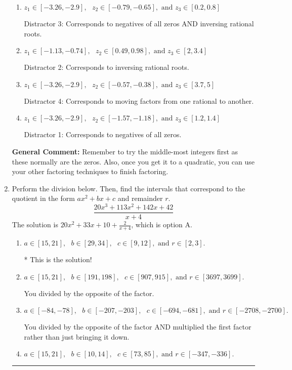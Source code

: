 \documentclass{extbook}[14pt]
\newcommand{\litem}[1]{\item #1

\rule{\textwidth}{0.4pt}}
\begin{document}
\begin{enumerate}
{\begin{enumerate}[label=\Alph*.]
* This is the solution!
\item \( z_1 \in [-3.26, -2.9], \text{   }  z_2 \in [-0.79, -0.65], \text{   and   } z_3 \in [0.2, 0.8] \)

 Distractor 3: Corresponds to negatives of all zeros AND inversing rational roots.
\item \( z_1 \in [-1.13, -0.74], \text{   }  z_2 \in [0.49, 0.98], \text{   and   } z_3 \in [2, 3.4] \)

 Distractor 2: Corresponds to inversing rational roots.
\item \( z_1 \in [-3.26, -2.9], \text{   }  z_2 \in [-0.57, -0.38], \text{   and   } z_3 \in [3.7, 5] \)

 Distractor 4: Corresponds to moving factors from one rational to another.
\item \( z_1 \in [-3.26, -2.9], \text{   }  z_2 \in [-1.57, -1.18], \text{   and   } z_3 \in [1.2, 1.4] \)

 Distractor 1: Corresponds to negatives of all zeros.
\end{enumerate}

\textbf{General Comment:} Remember to try the middle-most integers first as these normally are the zeros. Also, once you get it to a quadratic, you can use your other factoring techniques to finish factoring.
}
\litem{
Perform the division below. Then, find the intervals that correspond to the quotient in the form $ax^2+bx+c$ and remainder $r$.
\[ \frac{20x^{3} +113 x^{2} +142 x + 42}{x + 4} \]The solution is \( 20x^{2} +33 x + 10 + \frac{2}{x + 4} \), which is option A.\begin{enumerate}[label=\Alph*.]
\item \( a \in [15, 21], \text{   } b \in [29, 34], \text{   } c \in [9, 12], \text{   and   } r \in [2, 3]. \)

* This is the solution!
\item \( a \in [15, 21], \text{   } b \in [191, 198], \text{   } c \in [907, 915], \text{   and   } r \in [3697, 3699]. \)

 You divided by the opposite of the factor.
\item \( a \in [-84, -78], \text{   } b \in [-207, -203], \text{   } c \in [-694, -681], \text{   and   } r \in [-2708, -2700]. \)

 You divided by the opposite of the factor AND multiplied the first factor rather than just bringing it down.
\item \( a \in [15, 21], \text{   } b \in [10, 14], \text{   } c \in [73, 85], \text{   and   } r \in [-347, -336]. \)


\end{enumerate}}
\end{enumerate}
\end{document}
